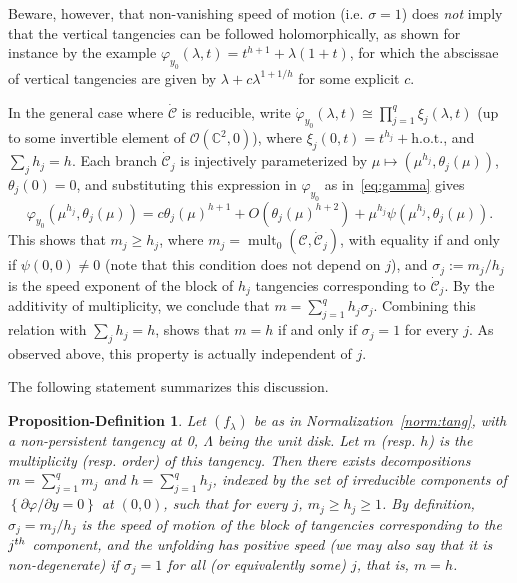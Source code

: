 \documentclass[11pt, oneside]{amsart}
\newcommand{\C}{\mathbb{C}}
\newcommand{\fr}{\partial}
\newcommand{\set}[1]{\left\{#1\right\}}
\newcommand{\cd}{{\C^2}}
\newcommand{\hot}{{\mathrm{h.o.t.}}}
\DeclareMathOperator{\mult}{mult}
\newtheorem{propdef}[prop]{Proposition-Definition}
\theoremstyle{remark}
\theoremstyle{definition}
\theoremstyle{theorem}
\newcommand{\commentaire}[1]{}
\begin{document}
 Beware, however, that non-vanishing speed of motion (i.e. $\sigma = 1$) 
 does \emph{not} 
 imply that the vertical tangencies can be followed holomorphically, as shown for instance 
 by the example $\varphi_{y_0}(\lambda, t) = t^{h+1} + \lambda (1+t)$, for 
 which the abscissae of vertical tangencies are given by $\lambda+ c \lambda^{1+1/h}$ for some 
 explicit $c$.   
  
 In the general case where $\dot{\mathcal C}$ is reducible, write 
 $\dot\varphi_{y_0}(\lambda, t) \cong \prod_{j=1}^q \xi_j(\lambda, t)$ (up to some invertible element of 
 $\mathcal O(\cd, 0)$), where $\xi_j(0, t) = t^{h_j}+\hot$, and $\sum_j h_j  = h$.  Each branch 
 $\dot{\mathcal C}_j$ is injectively parameterized by $\mu\mapsto (\mu^{h_j}, \theta_j(\mu))$, $\theta_j(0) =0$,
 and substituting this expression in $ \varphi_{y_0}$ as in~\eqref{eq:gamma} 
 gives 
 \begin{equation}\label{eq:gamma_j}
\varphi_{y_0}(\mu^{h_j}, \theta_j(\mu)) = c\theta_j (\mu)^{h+1} +  O({\theta_j (\mu)^{h+2}}) + 
 \mu^{h_j} \psi(\mu^{h_j}, \theta_j(\mu)).
 \end{equation}
 This shows that $m_j   \geq  h_j $, where 
 $m_j = \mult_0(\mathcal {C}, \dot{\mathcal C}_j)$, with equality if and only if $\psi(0, 0)\neq 0$ (note that this condition does not depend on $j$), and 
    $\sigma_j:=m_j/h_j$  
 is the   speed exponent  of the block of $h_j$ 
  tangencies corresponding to $\dot{\mathcal C}_j$. By the additivity of multiplicity, we conclude that 
  $m  = \sum_{j=1}^q h_j \sigma_j$. Combining this relation with  $\sum_j h_j  = h$, shows that 
   {$m=h$ if and only if 
   $\sigma_j = 1$ for every $j$}. As observed above, this property is actually independent of $j$.
 
 The following statement summarizes this discussion. \commentaire{New statement for Exposition Rmk \#3}
 
\begin{propdef}\label{propdef:speed}
Let  $(f_\lambda)$ be as in Normalization~\ref{norm:tang}, with a non-persistent tangency at 0, 
 $\Lambda$ being the unit disk. 
Let $m$ (resp. $h$) is the multiplicity (resp. order) of this tangency. Then there exists   decompositions $m = \sum_{j=1}^q m_j$ and $h = \sum_{j=1}^q h_j$, indexed by the set of  irreducible components of $\set{\fr \varphi/\fr y  = 0}$ at $(0,0)$, such that for every $j$, $m_j\geq h_j\geq 1$. By definition, 
$\sigma_j = m_j/h_j$ is the speed of motion of the block of tangencies corresponding to the 
 $j^{\rm th}$ component, 
and the unfolding has positive speed (we may also say that it is  non-degenerate)
 if $\sigma_j   = 1$ for all (or equivalently some) $j$, 
that is,   $m=h$. 
\end{propdef}
\end{document}
